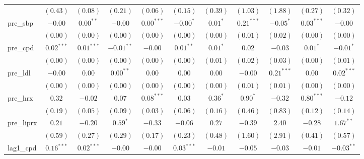 \begin{tabular}{l c c c c c c c c c c}
                 & $(0.43)$      & $(0.08)$      & $(0.21)$      & $(0.06)$      & $(0.15)$      & $(0.39)$       & $(1.03)$      & $(1.88)$       & $(0.27)$       & $(0.32)$      \\
pre\_sbp         & $-0.00$       & $0.00^{**}$   & $-0.00$       & $0.00^{***}$  & $-0.00^{*}$   & $0.01^{*}$     & $0.21^{***}$  & $-0.05^{*}$    & $0.03^{***}$   & $-0.00$       \\
                 & $(0.00)$      & $(0.00)$      & $(0.00)$      & $(0.00)$      & $(0.00)$      & $(0.00)$       & $(0.01)$      & $(0.02)$       & $(0.00)$       & $(0.00)$      \\
pre\_cpd         & $0.02^{***}$  & $0.01^{***}$  & $-0.01^{**}$  & $-0.00$       & $0.01^{**}$   & $0.01^{*}$     & $0.02$        & $-0.03$        & $0.01^{*}$     & $-0.01^{*}$   \\
                 & $(0.00)$      & $(0.00)$      & $(0.00)$      & $(0.00)$      & $(0.00)$      & $(0.01)$       & $(0.02)$      & $(0.03)$       & $(0.00)$       & $(0.01)$      \\
pre\_ldl         & $-0.00$       & $0.00$        & $0.00^{**}$   & $0.00$        & $0.00$        & $0.00$         & $-0.00$       & $0.21^{***}$   & $0.00$         & $0.02^{***}$  \\
                 & $(0.00)$      & $(0.00)$      & $(0.00)$      & $(0.00)$      & $(0.00)$      & $(0.00)$       & $(0.01)$      & $(0.01)$       & $(0.00)$       & $(0.00)$      \\
pre\_hrx         & $0.32$        & $-0.02$       & $0.07$        & $0.08^{***}$  & $0.03$        & $0.36^{*}$     & $0.90^{*}$    & $-0.32$        & $0.80^{***}$   & $-0.12$       \\
                 & $(0.19)$      & $(0.05)$      & $(0.09)$      & $(0.03)$      & $(0.06)$      & $(0.16)$       & $(0.46)$      & $(0.83)$       & $(0.12)$       & $(0.14)$      \\
pre\_liprx       & $0.21$        & $-0.20$       & $0.59^{*}$    & $-0.33$       & $-0.06$       & $0.27$         & $-0.39$       & $2.40$         & $-0.28$        & $1.67^{**}$   \\
                 & $(0.59)$      & $(0.27)$      & $(0.29)$      & $(0.17)$      & $(0.23)$      & $(0.48)$       & $(1.60)$      & $(2.91)$       & $(0.41)$       & $(0.57)$      \\
lag1\_cpd        & $0.16^{***}$  & $0.02^{***}$  & $-0.00$       & $-0.00$       & $0.03^{***}$  & $-0.01$        & $-0.05$       & $-0.03$        & $-0.01$        & $-0.03^{**}$  \\

\end{tabular}
